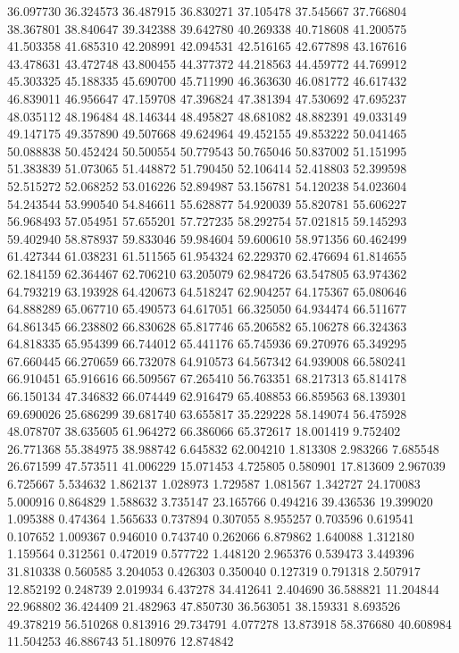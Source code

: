 36.097730
36.324573
36.487915
36.830271
37.105478
37.545667
37.766804
38.367801
38.840647
39.342388
39.642780
40.269338
40.718608
41.200575
41.503358
41.685310
42.208991
42.094531
42.516165
42.677898
43.167616
43.478631
43.472748
43.800455
44.377372
44.218563
44.459772
44.769912
45.303325
45.188335
45.690700
45.711990
46.363630
46.081772
46.617432
46.839011
46.956647
47.159708
47.396824
47.381394
47.530692
47.695237
48.035112
48.196484
48.146344
48.495827
48.681082
48.882391
49.033149
49.147175
49.357890
49.507668
49.624964
49.452155
49.853222
50.041465
50.088838
50.452424
50.500554
50.779543
50.765046
50.837002
51.151995
51.383839
51.073065
51.448872
51.790450
52.106414
52.418803
52.399598
52.515272
52.068252
53.016226
52.894987
53.156781
54.120238
54.023604
54.243544
53.990540
54.846611
55.628877
54.920039
55.820781
55.606227
56.968493
57.054951
57.655201
57.727235
58.292754
57.021815
59.145293
59.402940
58.878937
59.833046
59.984604
59.600610
58.971356
60.462499
61.427344
61.038231
61.511565
61.954324
62.229370
62.476694
61.814655
62.184159
62.364467
62.706210
63.205079
62.984726
63.547805
63.974362
64.793219
63.193928
64.420673
64.518247
62.904257
64.175367
65.080646
64.888289
65.067710
65.490573
64.617051
66.325050
64.934474
66.511677
64.861345
66.238802
66.830628
65.817746
65.206582
65.106278
66.324363
64.818335
65.954399
66.744012
65.441176
65.745936
69.270976
65.349295
67.660445
66.270659
66.732078
64.910573
64.567342
64.939008
66.580241
66.910451
65.916616
66.509567
67.265410
56.763351
68.217313
65.814178
66.150134
47.346832
66.074449
62.916479
65.408853
66.859563
68.139301
69.690026
25.686299
39.681740
63.655817
35.229228
58.149074
56.475928
48.078707
38.635605
61.964272
66.386066
65.372617
18.001419
9.752402
26.771368
55.384975
38.988742
6.645832
62.004210
1.813308
2.983266
7.685548
26.671599
47.573511
41.006229
15.071453
4.725805
0.580901
17.813609
2.967039
6.725667
5.534632
1.862137
1.028973
1.729587
1.081567
1.342727
24.170083
5.000916
0.864829
1.588632
3.735147
23.165766
0.494216
39.436536
19.399020
1.095388
0.474364
1.565633
0.737894
0.307055
8.955257
0.703596
0.619541
0.107652
1.009367
0.946010
0.743740
0.262066
6.879862
1.640088
1.312180
1.159564
0.312561
0.472019
0.577722
1.448120
2.965376
0.539473
3.449396
31.810338
0.560585
3.204053
0.426303
0.350040
0.127319
0.791318
2.507917
12.852192
0.248739
2.019934
6.437278
34.412641
2.404690
36.588821
11.204844
22.968802
36.424409
21.482963
47.850730
36.563051
38.159331
8.693526
49.378219
56.510268
0.813916
29.734791
4.077278
13.873918
58.376680
40.608984
11.504253
46.886743
51.180976
12.874842
